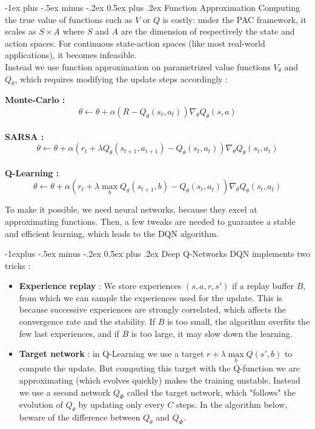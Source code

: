 \documentclass[10pt,landscape]{article}
\makeatletter
\renewcommand{\section}{\@startsection{section}{1}{0mm}%
                                {-1ex plus -.5ex minus -.2ex}%
                                {0.5ex plus .2ex}%
                                {\normalfont\large\bfseries}}
\renewcommand{\subsection}{\@startsection{subsection}{2}{0mm}%
                                {-1explus -.5ex minus -.2ex}%
                                {0.5ex plus .2ex}%
                                {\normalfont\normalsize\bfseries}}
\makeatother
\begin{document}
\begin{multicols}{3}

\section{Function Approximation}
Computing the true value of functions such as $V$ or $Q$ is costly: under the PAC framework, it scales as $S \times A$ where $S$ and $A$ are the dimension of respectively the state and action spaces. For continuous state-action spaces (like most real-world applications), it becomes infeasible.\\
Instead we use function approximation on parametrized value functions $V_\theta$ and $Q_\theta$, which requires modifying the update steps accordingly :

\medskip

\textbf{Monte-Carlo :}  $$\theta \leftarrow \theta + \alpha \left ( R - Q_\theta(s_t, a_t) \right ) \nabla_\theta Q_\theta(s,a)$$ \\
\textbf{SARSA :}  $$\theta \leftarrow \theta + \alpha \left ( r_t + \lambda Q_\theta(s_{t+1},a_{t+1}) - Q_\theta(s_t, a_t) \right ) \nabla_\theta Q_\theta(s_t,a_t)$$ \\
\textbf{Q-Learning :}  $$\theta \leftarrow \theta + \alpha \left ( r_t + \lambda \max\limits_b Q_\theta(s_{t+1},b) - Q_\theta(s_t, a_t) \right ) \nabla_\theta Q_\theta(s_t,a_t)$$

To make it possible, we need neural networks, because they excel at approximating functions. Then, a few tweaks are needed to guarantee a stable and efficient learning, which leads to the DQN algorithm.

\subsection{Deep Q-Networks}
DQN implements two tricks :
\begin{itemize}[leftmargin=*]
    \item \textbf{Experience replay} : We store experiences $(s,a,r,s')$ if a replay buffer $B$, from which we can sample the experiences used for the update. This is because successive experiences are strongly correlated, which affects the convergence rate and the stability. If $B$ is too small, the algorithm overfits the few last experiences, and if $B$ is too large, it may slow down the learning.
    \item \textbf{Target network} : in Q-Learning we use a target $r + \lambda \max\limits_b Q(s',b)$ to compute the update. But computing this target with the Q-function we are approximating (which evolves quickly) makes the training unstable. Instead we use a second network $Q_\Phi$ called the target network, which "follows" the evolution of $Q_\theta$ by updating only every $C$ steps. In the algorithm below, beware of the difference between $Q_\theta$ and $Q_\Phi$.
\end{itemize}



\end{multicols}
\end{document}
